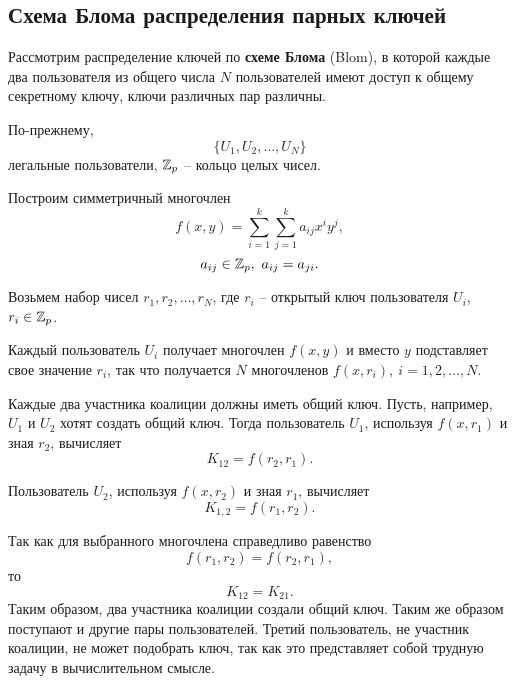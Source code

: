 ﻿\subsection{Схема Блома распределения парных ключей}

Рассмотрим распределение ключей по \textbf{схеме Блома} (Blom), в которой каждые два пользователя из общего числа $N$ пользователей имеют доступ к общему секретному ключу, ключи различных пар различны.

По-прежнему,
    \[ \{ U_1, U_2, \dots, U_N \} \]
легальные пользователи, $\mathbb{Z}_p$ -- кольцо целых чисел.

Построим симметричный многочлен
    \[ f(x,y) = \sum_{i=1}^k \sum_{j=1}^k a_{ij} x^i y^j, \]
    \[ a_{ij} \in \mathbb{Z}_p, ~ a_{ij} = a_{ji}. \]

Возьмем набор чисел $r_1, r_2, \dots, r_N$, где $r_i$ -- открытый ключ пользователя $U_i$, ~ $r_i \in \mathbb{Z}_p$.

Каждый пользователь $U_i$ получает многочлен $f(x,y)$ и вместо $y$ подставляет свое значение $r_i$, так что получается $N$ многочленов $f(x, r_i), ~ i = 1, 2, \dots, N$.

Каждые два участника коалиции должны иметь общий ключ. Пусть, например, $U_1$ и $U_2$ хотят создать общий ключ. Тогда пользователь $U_1$, используя $f(x, r_1)$ и зная $r_2$, вычисляет
    \[ K_{12} = f(r_2, r_1). \]

Пользователь $U_2$, используя $f(x, r_2)$ и зная $r_1$, вычисляет
    \[ K_{1,2} = f(r_1, r_2). \]

Так как для выбранного многочлена справедливо равенство
    \[ f(r_1, r_2) = f(r_2, r_1), \]
то
    \[ K_{12} = K_{21}. \]
Таким образом, два участника коалиции создали общий ключ. Таким же образом поступают и другие пары пользователей. Третий пользователь, не участник коалиции, не может подобрать ключ, так как это представляет собой трудную задачу в вычислительном смысле.

